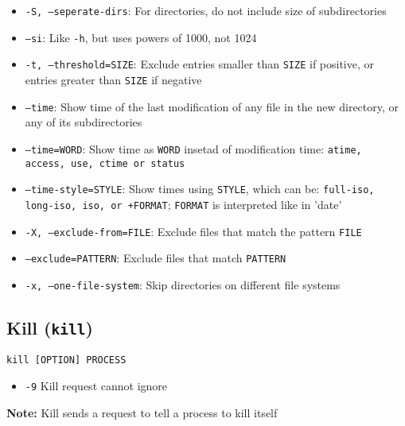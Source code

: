 \documentclass[13pt]{article}
\begin{document}
\begin{itemize}[leftmargin = 0pt]
\item [] \texttt{-S, --seperate-dirs}: For directories, do not include size of subdirectories
\item [] \texttt{--si}: Like \texttt{-h}, but uses powers of 1000, not 1024
\item [] \texttt{-t, --threshold=SIZE}: Exclude entries smaller than \texttt{SIZE} if positive, or entries greater than \texttt{SIZE} if negative
\item [] \texttt{--time}: Show time of the last modification of any file in the new directory, or any of its subdirectories
\item [] \texttt{--time=WORD}: Show time as \texttt{WORD} insetad of modification time: \texttt{atime, access, use, ctime or status}
\item [] \texttt{--time-style=STYLE}: Show times using \texttt{STYLE}, which can be: \texttt{full-iso, long-iso, iso, or +FORMAT}; \texttt{FORMAT} is interpreted like in 'date'
\item [] \texttt{-X, --exclude-from=FILE}: Exclude files that match the pattern \texttt{FILE}
\item [] \texttt{--exclude=PATTERN}: Exclude files that match \texttt{PATTERN}
\item [] \texttt{-x, --one-file-system}: Skip directories on different file systems
\end{itemize}

\subsection{Kill (\texttt{kill})}
\texttt{kill [OPTION] PROCESS}
\begin{itemize}[leftmargin = 0pt]
\item [] \texttt{-9} Kill request cannot ignore
\end{itemize}
\textbf{Note:} Kill sends a request to tell a process to kill itself
\end{document}
